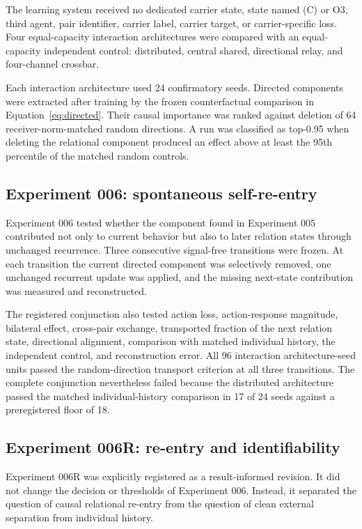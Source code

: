 \documentclass[11pt,a4paper]{article}
\begin{document}
The learning system received no dedicated carrier state, state named (C) or O3, third agent, pair identifier, carrier label, carrier target, or carrier-specific loss. Four equal-capacity interaction architectures were compared with an equal-capacity independent control: distributed, central shared, directional relay, and four-channel crossbar.

Each interaction architecture used 24 confirmatory seeds. Directed components were extracted after training by the frozen counterfactual comparison in Equation~\eqref{eq:directed}. Their causal importance was ranked against deletion of 64 receiver-norm-matched random directions. A run was classified as top-0.95 when deleting the relational component produced an effect above at least the 95th percentile of the matched random controls.

\subsection{Experiment 006: spontaneous self-re-entry}

Experiment 006 tested whether the component found in Experiment 005 contributed not only to current behavior but also to later relation states through unchanged recurrence. Three consecutive signal-free transitions were frozen. At each transition the current directed component was selectively removed, one unchanged recurrent update was applied, and the missing next-state contribution was measured and reconstructed.

The registered conjunction also tested action loss, action-response magnitude, bilateral effect, cross-pair exchange, transported fraction of the next relation state, directional alignment, comparison with matched individual history, the independent control, and reconstruction error. All 96 interaction architecture-seed units passed the random-direction transport criterion at all three transitions. The complete conjunction nevertheless failed because the distributed architecture passed the matched individual-history comparison in 17 of 24 seeds against a preregistered floor of 18.

\subsection{Experiment 006R: re-entry and identifiability}

Experiment 006R was explicitly registered as a result-informed revision. It did not change the decision or thresholds of Experiment 006. Instead, it separated the question of causal relational re-entry from the question of clean external separation from individual history.
\end{document}
